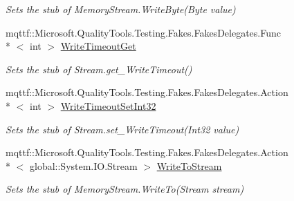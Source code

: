 \begin{DoxyCompactItemize}
\begin{DoxyCompactList}\small\item\em Sets the stub of Memory\-Stream.\-Write\-Byte(\-Byte value)\end{DoxyCompactList}\item 
mqttf\-::\-Microsoft.\-Quality\-Tools.\-Testing.\-Fakes.\-Fakes\-Delegates.\-Func\\*
$<$ int $>$ \hyperlink{class_system_1_1_i_o_1_1_fakes_1_1_stub_memory_stream_a7d7b54e784888bc355051823dc4a84a5}{Write\-Timeout\-Get}
\begin{DoxyCompactList}\small\item\em Sets the stub of Stream.\-get\-\_\-\-Write\-Timeout()\end{DoxyCompactList}\item 
mqttf\-::\-Microsoft.\-Quality\-Tools.\-Testing.\-Fakes.\-Fakes\-Delegates.\-Action\\*
$<$ int $>$ \hyperlink{class_system_1_1_i_o_1_1_fakes_1_1_stub_memory_stream_a3ddedc495d8a60effa2571cf1ad6cbce}{Write\-Timeout\-Set\-Int32}
\begin{DoxyCompactList}\small\item\em Sets the stub of Stream.\-set\-\_\-\-Write\-Timeout(\-Int32 value)\end{DoxyCompactList}\item 
mqttf\-::\-Microsoft.\-Quality\-Tools.\-Testing.\-Fakes.\-Fakes\-Delegates.\-Action\\*
$<$ global\-::\-System.\-I\-O.\-Stream $>$ \hyperlink{class_system_1_1_i_o_1_1_fakes_1_1_stub_memory_stream_a0887d5f5cb9a7dbbe2ac888ceec4f5d1}{Write\-To\-Stream}
\begin{DoxyCompactList}\small\item\em Sets the stub of Memory\-Stream.\-Write\-To(\-Stream stream)\end{DoxyCompactList}\end{DoxyCompactItemize}
